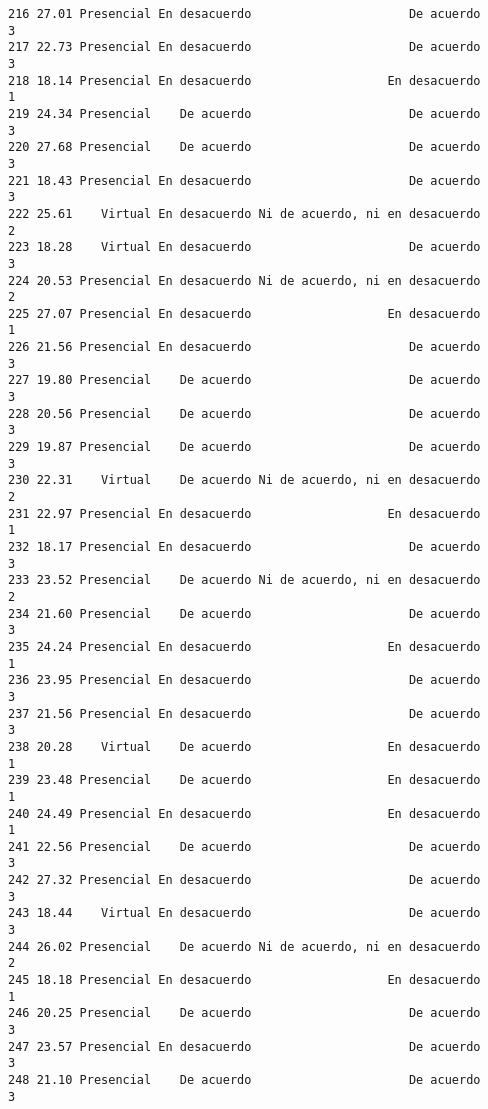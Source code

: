 \documentclass[
  letterpaper,
  DIV=11,
  numbers=noendperiod]{scrartcl}
\begin{document}
\begin{verbatim}
216 27.01 Presencial En desacuerdo                      De acuerdo           3
217 22.73 Presencial En desacuerdo                      De acuerdo           3
218 18.14 Presencial En desacuerdo                   En desacuerdo           1
219 24.34 Presencial    De acuerdo                      De acuerdo           3
220 27.68 Presencial    De acuerdo                      De acuerdo           3
221 18.43 Presencial En desacuerdo                      De acuerdo           3
222 25.61    Virtual En desacuerdo Ni de acuerdo, ni en desacuerdo           2
223 18.28    Virtual En desacuerdo                      De acuerdo           3
224 20.53 Presencial En desacuerdo Ni de acuerdo, ni en desacuerdo           2
225 27.07 Presencial En desacuerdo                   En desacuerdo           1
226 21.56 Presencial En desacuerdo                      De acuerdo           3
227 19.80 Presencial    De acuerdo                      De acuerdo           3
228 20.56 Presencial    De acuerdo                      De acuerdo           3
229 19.87 Presencial    De acuerdo                      De acuerdo           3
230 22.31    Virtual    De acuerdo Ni de acuerdo, ni en desacuerdo           2
231 22.97 Presencial En desacuerdo                   En desacuerdo           1
232 18.17 Presencial En desacuerdo                      De acuerdo           3
233 23.52 Presencial    De acuerdo Ni de acuerdo, ni en desacuerdo           2
234 21.60 Presencial    De acuerdo                      De acuerdo           3
235 24.24 Presencial En desacuerdo                   En desacuerdo           1
236 23.95 Presencial En desacuerdo                      De acuerdo           3
237 21.56 Presencial En desacuerdo                      De acuerdo           3
238 20.28    Virtual    De acuerdo                   En desacuerdo           1
239 23.48 Presencial    De acuerdo                   En desacuerdo           1
240 24.49 Presencial En desacuerdo                   En desacuerdo           1
241 22.56 Presencial    De acuerdo                      De acuerdo           3
242 27.32 Presencial En desacuerdo                      De acuerdo           3
243 18.44    Virtual En desacuerdo                      De acuerdo           3
244 26.02 Presencial    De acuerdo Ni de acuerdo, ni en desacuerdo           2
245 18.18 Presencial En desacuerdo                   En desacuerdo           1
246 20.25 Presencial    De acuerdo                      De acuerdo           3
247 23.57 Presencial En desacuerdo                      De acuerdo           3
248 21.10 Presencial    De acuerdo                      De acuerdo           3

\end{verbatim}
\end{document}
